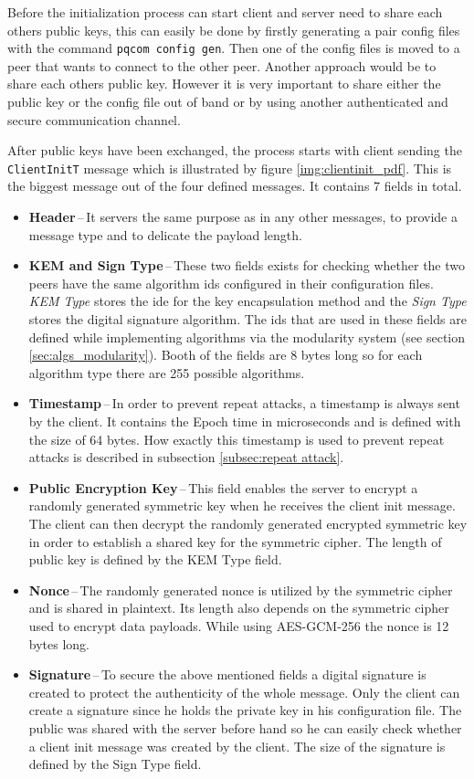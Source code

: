 Before the initialization process can start client and server need to share each others public keys, this can easily be done by firstly generating a pair config files with the command \texttt{pqcom config gen}. Then one of the config files is moved to a peer that wants to connect to the other peer. Another approach would be to share each others public key. However it is very important to share either the public key or the config file out of band or by using another authenticated and secure communication channel.

After public keys have been exchanged, the process starts with client sending the \texttt{ClientInitT} message which is illustrated by figure \ref{img:clientinit_pdf}. This is the biggest message out of the four defined messages. It contains 7 fields in total.
\begin{itemize}
  \item \textbf{Header}\,--\,It servers the same purpose as in any other messages, to provide a message type and to delicate the payload length.
  \item \textbf{KEM and Sign Type}\,--\,These two fields exists for checking whether the two peers have the same algorithm ids configured in their configuration files. \textit{KEM Type} stores the ide for the key encapsulation method and the \textit{Sign Type} stores the digital signature algorithm. The ids that are used in these fields are defined while implementing algorithms via the modularity system (see section \ref{sec:algs_modularity}). Booth of the fields are 8 bytes long so for each algorithm type there are 255 possible algorithms.
  \item \textbf{Timestamp}\,--\,In order to prevent repeat attacks, a timestamp is always sent by the client. It contains the Epoch time in microseconds and is defined with the size of 64 bytes. How exactly this timestamp is used to prevent repeat attacks is described in subsection \ref{subsec:repeat attack}.
  \item \textbf{Public Encryption Key}\,--\,This field enables the server to encrypt a randomly generated symmetric key when he receives the client init message. The client can then decrypt the randomly generated encrypted symmetric key in order to establish a shared key for the symmetric cipher. The length of public key is defined by the KEM Type field.
  \item \textbf{Nonce}\,--\,The randomly generated nonce is utilized by the symmetric cipher and is shared in plaintext. Its length also depends on the symmetric cipher used to encrypt data payloads. While using AES-GCM-256 the nonce is 12 bytes long.
  \item \textbf{Signature}\,--\,To secure the above mentioned fields a digital signature is created to protect the authenticity of the whole message. Only the client can create a signature since he holds the private key in his configuration file. The public was shared with the server before hand so he can easily check whether a client init message was created by the client. The size of the signature is defined by the Sign Type field.
\end{itemize}

